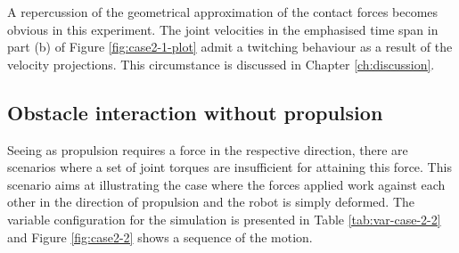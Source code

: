 A repercussion of the geometrical approximation of the contact forces becomes obvious in this experiment. The joint velocities in the emphasised time span in part (b) of Figure \ref{fig:case2-1-plot} admit a twitching behaviour as a result of the velocity projections. This circumstance is discussed in Chapter \ref{ch:discussion}.

\subsection{Obstacle interaction without propulsion}\label{subseq:case22}

Seeing as propulsion requires a force in the respective direction, there are scenarios where a set of joint torques are insufficient for attaining this force. This scenario aims at illustrating the case where the forces applied work against each other in the direction of propulsion and the robot is simply deformed. The variable configuration for the simulation is presented in Table \ref{tab:var-case-2-2} and Figure \ref{fig:case2-2} shows a sequence of the motion.

